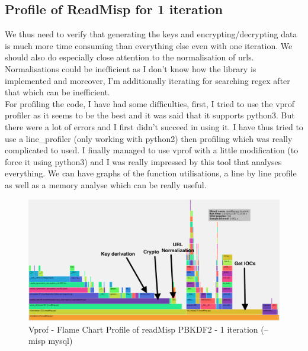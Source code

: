 \documentclass{eplmastersthesis}
\begin{document}
\subsection{Profile of ReadMisp for 1 iteration}
We thus need to verify that generating the keys and encrypting/decrypting data is much more time consuming than everything else even with one iteration.
We should also do especially close attention to the normalisation of \gls{url}s. Normalisations could be inefficient as I don't know how the library is implemented and moreover, I'm additionally iterating for searching regex after that which can be inefficient.\\

For profiling the code, I have had some difficulties, first, I tried to use the vprof profiler as it seems to be the best and it was said that it supports python3.
But there were a lot of errors and I first didn't succeed in using it. I have thus tried to use a line\_profiler (only working with python2) then profiling which was really complicated to used. 
I finally managed to use vprof with a little modification (to force it using python3) and I was really impressed by this tool that analyses everything. We can have graphs of the function utilisations, a line by line profile as well as a memory analyse which can be really useful.\\

\begin{figure}[h!]
\begin{center}
	\includegraphics[scale=0.3]{res/profile-1iter}
	\caption{Vprof - Flame Chart Profile of readMisp PBKDF2 - 1 iteration (--misp mysql)}
	\label{profile-readMisp}
\end{center}
\end{figure}
\end{document}
